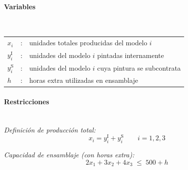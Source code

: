 


\paragraph{Variables}\mbox{}\\

\begin{tabular}{lcl}
$x_i$ & : & unidades totales producidas del modelo $i$ \\
$y_i^{\mathrm{I}}$ & : & unidades del modelo $i$ pintadas internamente \\
$y_i^{\mathrm{S}}$ & : & unidades del modelo $i$ cuya pintura se subcontrata \\
$h$ & : & horas extra utilizadas en ensamblaje \\
\end{tabular}

\paragraph{Restricciones}\mbox{}\\[1mm]

\textit{Definición de producción total:}
\begin{equation}
x_i = y_i^{\mathrm{I}} + y_i^{\mathrm{S}} \qquad i = 1,2,3
\end{equation}

\textit{Capacidad de ensamblaje (con horas extra):}
\begin{equation}
2x_1 + 3x_2 + 4x_3 \;\leq\; 500 + h
\end{equation}

